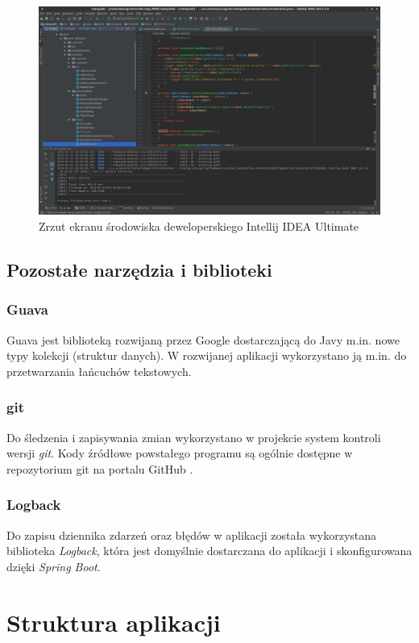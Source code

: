 \begin{figure}
	\centering
	\includegraphics[width=0.9\columnwidth]{img/robopath/intellij}
	\caption{Zrzut ekranu środowiska deweloperskiego Intellij IDEA Ultimate}
	\label{fig:app-tech-intellij}
\end{figure}

\subsection{Pozostałe narzędzia i biblioteki}
\subsubsection{Guava}
Guava jest biblioteką rozwijaną przez Google dostarczającą do Javy m.in. nowe typy kolekcji (struktur danych). W rozwijanej aplikacji wykorzystano ją m.in. do przetwarzania łańcuchów tekstowych.
\subsubsection{git}
Do śledzenia i zapisywania zmian wykorzystano w projekcie system kontroli wersji {\it git}.
Kody źródłowe powstałego programu są ogólnie dostępne w repozytorium git na portalu GitHub \cite{github-coop-pathfinder}.

\subsubsection{Logback}
Do zapisu dziennika zdarzeń oraz błędów w aplikacji została wykorzystana biblioteka {\it Logback}, która jest domyślnie dostarczana do aplikacji i skonfigurowana dzięki {\it Spring Boot}.


\section{Struktura aplikacji}
